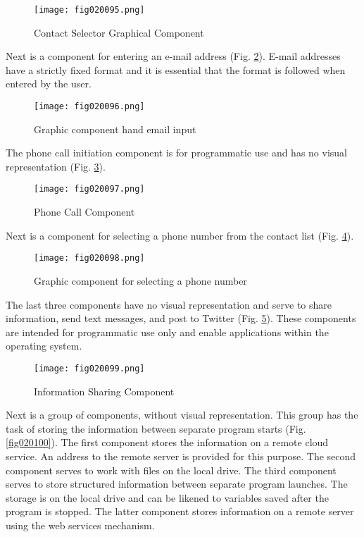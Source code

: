 \begin{figure}[H]
   \centering
   \texttt{[image: fig020095.png]}
   \caption{Contact Selector Graphical Component}
\label{fig020095}
\end{figure}

Next is a component for entering an e-mail address (Fig. \ref{fig020096}). E-mail addresses have a strictly fixed format and it is essential that the format is followed when entered by the user.

\begin{figure}[H]
   \centering
   \texttt{[image: fig020096.png]}
   \caption{Graphic component hand email input}
\label{fig020096}
\end{figure}

The phone call initiation component is for programmatic use and has no visual representation (Fig. \ref{fig020097}).

\begin{figure}[H]
   \centering
   \texttt{[image: fig020097.png]}
   \caption{Phone Call Component}
\label{fig020097}
\end{figure}

Next is a component for selecting a phone number from the contact list (Fig. \ref{fig020098}).

\begin{figure}[H]
   \centering
   \texttt{[image: fig020098.png]}
   \caption{Graphic component for selecting a phone number}
\label{fig020098}
\end{figure}

The last three components have no visual representation and serve to share information, send text messages, and post to Twitter (Fig. \ref{fig020099}). These components are intended for programmatic use only and enable applications within the operating system.

\begin{figure}[H]
   \centering
   \texttt{[image: fig020099.png]}
   \caption{Information Sharing Component}
\label{fig020099}
\end{figure}

Next is a group of components, without visual representation. This group has the task of storing the information between separate program starts (Fig. \ref{fig020100}). The first component stores the information on a remote cloud service. An address to the remote server is provided for this purpose. The second component serves to work with files on the local drive. The third component serves to store structured information between separate program launches. The storage is on the local drive and can be likened to variables saved after the program is stopped. The latter component stores information on a remote server using the web services mechanism.

